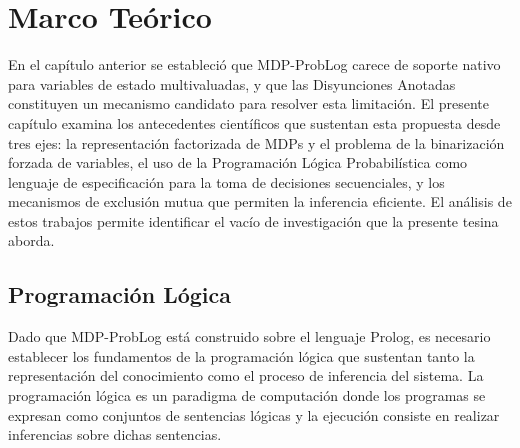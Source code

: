 \clearpage



\section{Marco Teórico}
\label{ch:marco-teorico}

En el capítulo anterior se estableció que MDP-ProbLog carece de soporte nativo para variables de estado multivaluadas, y que las Disyunciones Anotadas constituyen un mecanismo candidato para resolver esta limitación. El presente capítulo examina los antecedentes científicos que sustentan esta propuesta desde tres ejes: la representación factorizada de MDPs y el problema de la binarización forzada de variables, el uso de la Programación Lógica Probabilística como lenguaje de especificación para la toma de decisiones secuenciales, y los mecanismos de exclusión mutua que permiten la inferencia eficiente. El análisis de estos trabajos permite identificar el vacío de investigación que la presente tesina aborda.


\subsection{Programación Lógica}
\label{sec:mt-pl}

Dado que MDP-ProbLog está construido sobre el lenguaje Prolog, es necesario establecer los fundamentos de la programación lógica que sustentan tanto la representación del conocimiento como el proceso de inferencia del sistema. La programación lógica es un paradigma de computación donde los programas se expresan como conjuntos de sentencias lógicas y la ejecución consiste en realizar inferencias sobre dichas sentencias.

